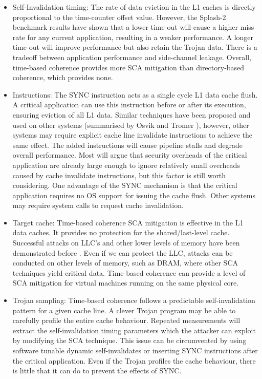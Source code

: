 	\begin{itemize}
		\item Self-Invalidation timing: The rate of data eviction in the L1 caches is directly proportional to the time-counter offset value. However, the Splash-2 benchmark results have shown that a lower time-out will cause a higher miss rate for any current application, resulting in a weaker performance. A longer time-out will improve performance but also retain the Trojan data. There is a tradeoff between application performance and side-channel leakage. Overall, time-based coherence provides more SCA mitigation than directory-based coherence, which provides none.
		\item Instructions: The SYNC instruction acts as a single cycle L1 data cache flush. A critical application can use this instruction before or after its execution, ensuring eviction of all L1 data. Similar techniques have been proposed and used on other systems (summarised by Osvik and Tromer \cite{Osvik06,Tromer10}), however, other systems may require explicit cache line invalidate instructions to achieve the same effect. The added instructions will cause pipeline stalls and degrade overall performance. 
		Most will argue that security overheads of the critical application are already large enough to ignore relatively small overheads caused by cache invalidate instructions, but this factor is still worth considering. One advantage of the SYNC mechanism is that the critical application requires no OS support for issuing the cache flush. Other systems may require system calls to request cache invalidation.
		\item Target cache: Time-based coherence SCA mitigation is effective in the L1 data caches. It provides no protection for the shared/last-level cache. Successful attacks on LLC's and other lower levels of memory have been demonstrated before \cite{Irazoqui15,Yarom14,Hund13,Brumley11}. Even if we can protect the LLC, attacks can be conducted on other levels of memory, such as DRAM, where other SCA techniques yield critical data. Time-based coherence can provide a level of SCA mitigation for virtual machines running on the same physical core.
		\item Trojan sampling: Time-based coherence follows a predictable self-invalidation pattern for a given cache line. A clever Trojan program may be able to carefully profile the entire cache behaviour. Repeated measurements will extract the self-invalidation timing parameters which the attacker can exploit by modifying the SCA technique. This issue can be circumvented by using software tunable dynamic self-invalidates or inserting SYNC instructions after the critical application. Even if the Trojan profiles the cache behaviour, there is little that it can do to prevent the effects of SYNC.

\end{itemize}
